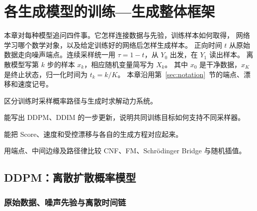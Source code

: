 \chapter{各生成模型的训练---生成整体框架}
\label{ch:model-overview}

本章对每种模型追问四件事。它怎样连接数据与先验，训练样本如何取得，
网络学习哪个数学对象，以及给定训练好的网络后怎样生成样本。
正向时间 \(t\) 从原始数据走向噪声端点。连续采样统一用
\(\tau=1-t\)，从 \(Y_0\) 出发，在 \(Y_1\) 读出样本。
离散模型写第 \(k\) 步的样本 \(x_k\)，相应随机变量简写为 \(X_k\)。
其中 \(x_0\) 是干净数据，\(x_K\) 是终止状态，归一化时间为 \(t_k=k/K\)。
本章沿用第~\ref{sec:notation}~节的端点、漂移和速度记号。

\begin{learningobjectives}
  \item 区分训练时采样概率路径与生成时求解动力系统。
  \item 能写出 DDPM、DDIM 的一步更新，说明共同训练目标如何支持不同采样器。
  \item 能把 Score、速度和受控漂移与各自的生成方程对应起来。
  \item 用端点、中间边缘及路径律比较 CNF、FM、Schrödinger Bridge 与随机插值。
\end{learningobjectives}

\newcommand{\modelworkflow}[6]{%
  \par\smallskip
  \begingroup\small\renewcommand{\arraystretch}{1.25}%
  \noindent\begin{tabularx}{\linewidth}{@{}>{\bfseries}l @{\quad}
    >{\RaggedRight\arraybackslash}X @{\enspace\(\to\)\enspace}
    >{\RaggedRight\arraybackslash}X @{\enspace\(\to\)\enspace}
    >{\RaggedRight\arraybackslash}X@{}}
    \toprule
    训练 & #1 & #2 & #3\\
    生成 & #4 & #5 & #6\\
    \bottomrule
  \end{tabularx}\par
  \endgroup\smallskip}

\section{DDPM：离散扩散概率模型}
\label{sec:overview-ddpm}

\subsection{原始数据、噪声先验与离散时间链}

